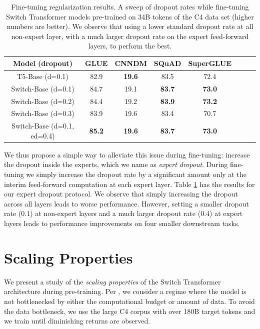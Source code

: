 \documentclass[twoside,11pt]{article}
\begin{document}
\begin{table}[h!]
\begin{center}
\begin{tabular}{cccccccc}
    \toprule
    {Model (dropout)} & {GLUE} & {CNNDM} & {SQuAD} & {SuperGLUE}\\ \hline
    T5-Base (d=0.1) & 82.9 & \textbf{19.6} & 83.5  & 72.4\\
    Switch-Base (d=0.1) & 84.7 & 19.1 & \textbf{83.7} & \textbf{73.0}\\
    Switch-Base (d=0.2) & 84.4 & 19.2 & \textbf{83.9} & \textbf{73.2}\\
    Switch-Base (d=0.3) & 83.9 & 19.6 & 83.4 & 70.7 \\
    Switch-Base (d=0.1, ed=0.4) & \textbf{85.2} & \textbf{19.6} & \textbf{83.7} & \textbf{73.0} \\
    \bottomrule
\end{tabular}
\caption{Fine-tuning regularization results. A sweep of dropout rates while fine-tuning Switch Transformer models pre-trained on 34B tokens of the C4 data set (higher numbers are better). We observe that using a lower standard dropout rate at all non-expert layer, with a much larger dropout rate on the expert feed-forward layers, to perform the best.}
\label{tab:expert_dropout}
\end{center}
\end{table}

We thus propose a simple way to alleviate this issue during fine-tuning: increase the dropout inside the experts, which we name as \emph{expert dropout}.
During fine-tuning we simply increase the dropout rate by a significant amount only at the interim feed-forward computation at each expert layer.
Table \ref{tab:expert_dropout} has the results for our expert dropout protocol.
We observe that simply increasing the dropout across all layers leads to worse performance.
However, setting a smaller dropout rate (0.1) at non-expert layers and a much larger dropout rate (0.4) at expert layers leads to performance improvements on four smaller downstream tasks.

\section{Scaling Properties}\label{sec: scaling}
We present a study of the \emph{scaling properties} of the Switch Transformer architecture during pre-training.
Per \citet{kaplan2020scaling}, we consider a regime where the model is not bottlenecked by either the computational budget or amount of data.
To avoid the data bottleneck, we use the large C4 corpus with over 180B target tokens \citep{raffel2019exploring} and we train until diminishing returns are observed.
\end{document}
